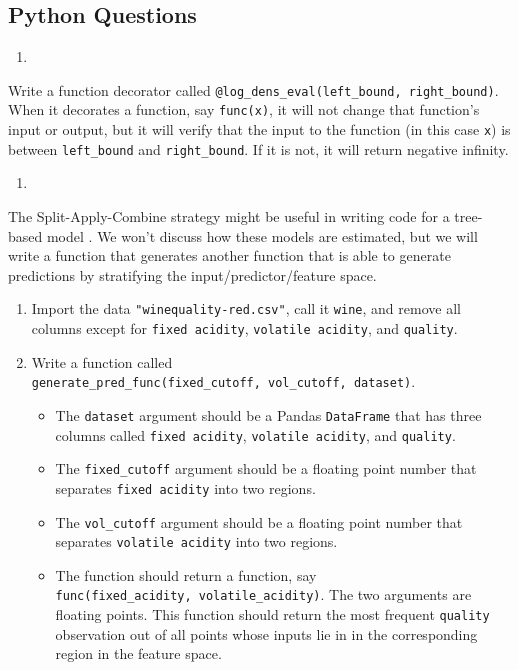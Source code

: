 \documentclass[
  12pt,
  krantz2]{krantz}
\providecommand{\tightlist}{%
  \setlength{\itemsep}{0pt}\setlength{\parskip}{0pt}}
\begin{document}
\hypertarget{python-questions-12}{%
\subsection{Python Questions}\label{python-questions-12}}

\begin{enumerate}
\def\labelenumi{\arabic{enumi}.}
\tightlist
\item
\end{enumerate}

Write a function decorator called \texttt{@log\_dens\_eval(left\_bound,\ right\_bound)}. When it decorates a function, say \texttt{func(x)}, it will not change that function's input or output, but it will verify that the input to the function (in this case \texttt{x}) is between \texttt{left\_bound} and \texttt{right\_bound}. If it is not, it will return negative infinity.

\begin{enumerate}
\def\labelenumi{\arabic{enumi}.}
\setcounter{enumi}{1}
\tightlist
\item
\end{enumerate}

The Split-Apply-Combine strategy might be useful in writing code for a tree-based model \citep{trees}. We won't discuss how these models are estimated, but we will write a function that generates another function that is able to generate predictions by stratifying the input/predictor/feature space.

\begin{enumerate}
\def\labelenumi{\alph{enumi})}
\tightlist
\item
  Import the data \texttt{"winequality-red.csv"}, call it \texttt{wine}, and remove all columns except for \texttt{fixed\ acidity}, \texttt{volatile\ acidity}, and \texttt{quality}.
\item
  Write a function called \texttt{generate\_pred\_func(fixed\_cutoff,\ vol\_cutoff,\ dataset)}.

  \begin{itemize}
  \tightlist
  \item
    The \texttt{dataset} argument should be a Pandas \texttt{DataFrame} that has three columns called \texttt{fixed\ acidity}, \texttt{volatile\ acidity}, and \texttt{quality}.
  \item
    The \texttt{fixed\_cutoff} argument should be a floating point number that separates \texttt{fixed\ acidity} into two regions.
  \item
    The \texttt{vol\_cutoff} argument should be a floating point number that separates \texttt{volatile\ acidity} into two regions.
  \item
    The function should return a function, say \texttt{func(fixed\_acidity,\ volatile\_acidity)}. The two arguments are floating points. This function should return the most frequent \texttt{quality} observation out of all points whose inputs lie in in the corresponding region in the feature space.
  \end{itemize}
\end{enumerate}
\end{document}
